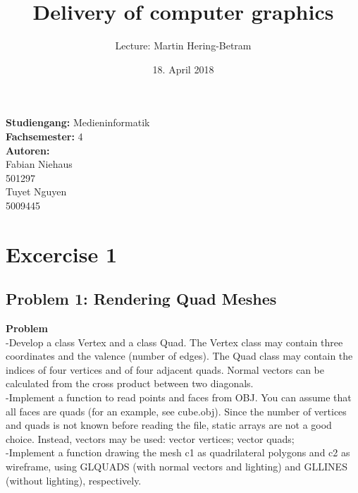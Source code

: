 \documentclass[12pt,a4paper]{scrartcl}
\author{Lecture: Martin Hering-Betram}
\title{Delivery of computer graphics}
\date{18. April 2018}
\begin{document}
\maketitle

\begin{center}

\Large
\textbf{Studiengang:} Medieninformatik
\\
\textbf{Fachsemester:} 4
\\[3cm]
\textbf {Autoren:}
\\Fabian Niehaus
\\501297
\\Tuyet Nguyen
\\5009445

\end{center}
\newpage
\Large
\tableofcontents
\newpage
\Large
\vspace{3cm}
\section{Excercise 1}

\subsection{Problem 1: Rendering Quad Meshes}

\large
\textbf{Problem} \\
-Develop a class Vertex and a class Quad. The Vertex class may contain three coordinates and the
valence (number of edges). The Quad class may contain the indices of four vertices and of four
adjacent quads. Normal vectors can be calculated from the cross product between two diagonals.\\
-Implement a function to read points and faces from OBJ. You can assume that all faces are quads (for an example, see cube.obj). Since the number of vertices and quads is not known before reading the file, static arrays are not a good choice. Instead, vectors may be used: vector vertices; vector quads;\\
-Implement a function drawing the mesh c1 as quadrilateral polygons and c2 as wireframe, using GLQUADS (with normal vectors and lighting) and GLLINES (without lighting), respectively.\\[0,5cm]
\end{document}

